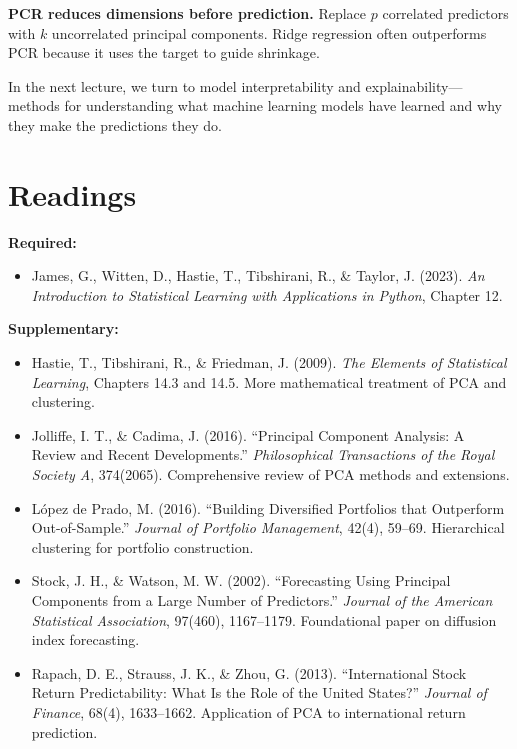 \documentclass[11pt,a4paper]{article}
\begin{document}
\textbf{PCR reduces dimensions before prediction.} Replace $p$ correlated predictors with $k$ uncorrelated principal components. Ridge regression often outperforms PCR because it uses the target to guide shrinkage.

In the next lecture, we turn to model interpretability and explainability---methods for understanding what machine learning models have learned and why they make the predictions they do.

\section*{Readings}

\textbf{Required:}
\begin{itemize}
    \item James, G., Witten, D., Hastie, T., Tibshirani, R., \& Taylor, J. (2023). \textit{An Introduction to Statistical Learning with Applications in Python}, Chapter 12.
\end{itemize}

\textbf{Supplementary:}
\begin{itemize}
    \item Hastie, T., Tibshirani, R., \& Friedman, J. (2009). \textit{The Elements of Statistical Learning}, Chapters 14.3 and 14.5. More mathematical treatment of PCA and clustering.
    \item Jolliffe, I. T., \& Cadima, J. (2016). ``Principal Component Analysis: A Review and Recent Developments.'' \textit{Philosophical Transactions of the Royal Society A}, 374(2065). Comprehensive review of PCA methods and extensions.
    \item L\'{o}pez de Prado, M. (2016). ``Building Diversified Portfolios that Outperform Out-of-Sample.'' \textit{Journal of Portfolio Management}, 42(4), 59--69. Hierarchical clustering for portfolio construction.
    \item Stock, J. H., \& Watson, M. W. (2002). ``Forecasting Using Principal Components from a Large Number of Predictors.'' \textit{Journal of the American Statistical Association}, 97(460), 1167--1179. Foundational paper on diffusion index forecasting.
    \item Rapach, D. E., Strauss, J. K., \& Zhou, G. (2013). ``International Stock Return Predictability: What Is the Role of the United States?'' \textit{Journal of Finance}, 68(4), 1633--1662. Application of PCA to international return prediction.
\end{itemize}

\end{document}
